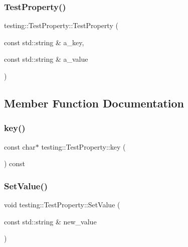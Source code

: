 \subsubsection{\texorpdfstring{Test\+Property()}{TestProperty()}}
{\footnotesize\ttfamily testing\+::\+Test\+Property\+::\+Test\+Property (\begin{DoxyParamCaption}\item[{const std\+::string \&}]{a\+\_\+key,  }\item[{const std\+::string \&}]{a\+\_\+value }\end{DoxyParamCaption})\hspace{0.3cm}{\ttfamily [inline]}}



\subsection{Member Function Documentation}
\mbox{\label{classtesting_1_1TestProperty_ad60435d4ad04ac030487d8998fc61c5f}} 
\subsubsection{\texorpdfstring{key()}{key()}}
{\footnotesize\ttfamily const char$\ast$ testing\+::\+Test\+Property\+::key (\begin{DoxyParamCaption}{ }\end{DoxyParamCaption}) const\hspace{0.3cm}{\ttfamily [inline]}}

\mbox{\label{classtesting_1_1TestProperty_a377245335d9f614cd06d1650e3358e1d}} 
\subsubsection{\texorpdfstring{Set\+Value()}{SetValue()}}
{\footnotesize\ttfamily void testing\+::\+Test\+Property\+::\+Set\+Value (\begin{DoxyParamCaption}\item[{const std\+::string \&}]{new\+\_\+value }\end{DoxyParamCaption})\hspace{0.3cm}{\ttfamily [inline]}}


